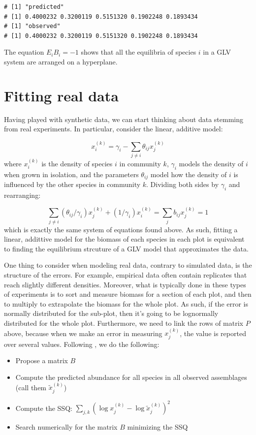\documentclass[
]{book}
\providecommand{\tightlist}{%
  \setlength{\itemsep}{0pt}\setlength{\parskip}{0pt}}
\begin{document}
\begin{verbatim}
# [1] "predicted"
# [1] 0.4000232 0.3200119 0.5151320 0.1902248 0.1893434
# [1] "observed"
# [1] 0.4000232 0.3200119 0.5151320 0.1902248 0.1893434
\end{verbatim}

The equation \(E_i B_i = -1\) shows that all the equilibria of species \(i\) in a GLV system are arranged on a hyperplane.

\hypertarget{fitting-real-data}{%
\section{Fitting real data}\label{fitting-real-data}}

Having played with synthetic data, we can start thinking about data stemming from real experiments. In particular, consider the linear, additive model:

\[
x_i^{(k)} = \gamma_i - \sum_{j\neq i} \theta_{ij} x_j^{(k)}
\]
where \(x_i^{(k)}\) is the density of species \(i\) in community \(k\), \(\gamma_i\) models the density of \(i\) when grown in isolation, and the parameters \(\theta_{ij}\) model how the density of \(i\) is influenced by the other species in community \(k\). Dividing both sides by \(\gamma_i\) and rearranging:

\[
\sum_{j\neq i} (\theta_{ij} /\gamma_i) x_j^{(k)} + (1/{\gamma_i}) x_i^{(k)}= \sum_j b_{ij} x_j^{(k)} = 1
\]
which is exactly the same system of equations found above. As such, fitting a linear, addittive model for the biomass of each species in each plot is equivalent to finding the equilibrium strcuture of a GLV model that approximates the data.

One thing to consider when modeling real data, contrary to simulated data, is the structure of the errors. For example, empirical data often contain replicates that reach slightly different densities. Moreover, what is typically done in these types of experiments is to sort and measure biomass for a section of each plot, and then to multiply to extrapolate the biomass for the whole plot. As such, if the error is normally distributed for the sub-plot, then it's going to be lognormally distributed for the whole plot. Furthermore, we need to link the rows of matrix \(P\) above, because when we make an error in measuring \(x_j^{(k)}\), the value is reported over several values. Following \citet{maynard2019predicting}, we do the following:

\begin{itemize}
\tightlist
\item
  Propose a matrix \(B\)
\item
  Compute the predicted abundance for all species in all observed assemblages (call them \(\tilde{x}_j^{(k)}\))
\item
  Compute the SSQ: \(\sum_{j, k} (\log x_j^{(k)} - \log \tilde{x}_j^{(k)})^2\)
\item
  Search numerically for the matrix \(B\) minimizing the SSQ
\end{itemize}
\end{document}
